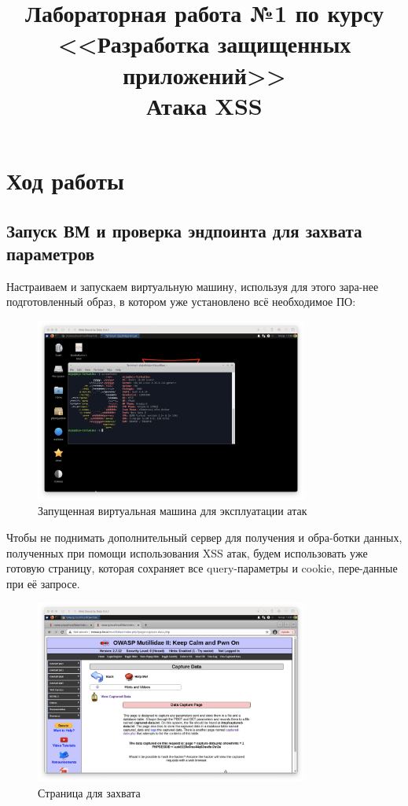 \documentclass[a4paper]{article}
\title{
  Лабораторная работа №1 по курсу \\
  <<Разработка защищенных приложений>> \\
  Атака XSS
}
\begin{document}
  \templatedtitlepage
  
  \toc
  \section{Ход работы}

  \subsection{Запуск ВМ и проверка эндпоинта для захвата параметров}

  Настраиваем и запускаем виртуальную машину, используя для этого зара-нее подготовленный образ,
  в котором уже установлено всё необходимое ПО:

  \begin{figure}[H]
    \centering
    \includegraphics[width=0.8\textwidth]{step_00001}
    \caption{Запущенная виртуальная машина для эксплуатации атак}
  \end{figure}

  Чтобы не поднимать дополнительный сервер для получения и обра-ботки данных,
  полученных при помощи использования XSS атак, будем использовать уже готовую страницу,
  которая сохраняет все query-параметры и cookie, пере-данные при её запросе.

  \begin{figure}[H]
    \centering
    \includegraphics[width=0.8\textwidth]{step_00013}
    \caption{Страница для захвата}
  \end{figure}
\end{document}
